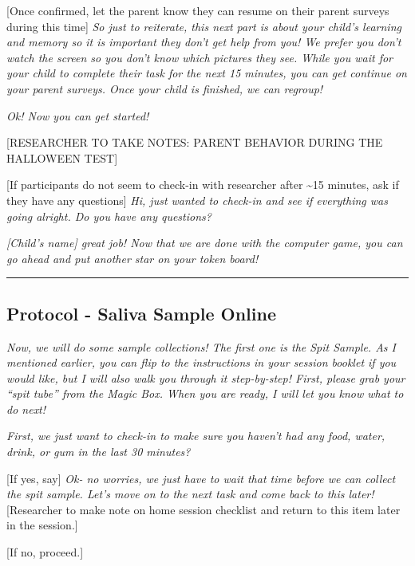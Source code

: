 \documentclass[]{book}
\begin{document}
{[}Once confirmed, let the parent know they can resume on their parent surveys during this time{]} \emph{So just to reiterate, this next part is about your child's learning and memory so it is important they don't get help from you! We prefer you don't watch the screen so you don't know which pictures they see. While you wait for your child to complete their task for the next 15 minutes, you can get continue on your parent surveys. Once your child is finished, we can regroup!}

\emph{Ok! Now you can get started!}

{[}RESEARCHER TO TAKE NOTES: PARENT BEHAVIOR DURING THE HALLOWEEN TEST{]}

{[}If participants do not seem to check-in with researcher after \textasciitilde{}15 minutes, ask if they have any questions{]} \emph{Hi, just wanted to check-in and see if everything was going alright. Do you have any questions?}

\emph{{[}Child's name{]} great job! Now that we are done with the computer game, you can go ahead and put another star on your token board!}

\begin{center}\rule{0.5\linewidth}{0.5pt}\end{center}

\hypertarget{protocol---saliva-sample-online-1}{%
\subsection{Protocol - Saliva Sample Online}\label{protocol---saliva-sample-online-1}}

\emph{Now, we will do some sample collections! The first one is the Spit Sample. As I mentioned earlier, you can flip to the instructions in your session booklet if you would like, but I will also walk you through it step-by-step! First, please grab your ``spit tube'' from the Magic Box. When you are ready, I will let you know what to do next!}

\emph{First, we just want to check-in to make sure you haven't had any food, water, drink, or gum in the last 30 minutes?}

{[}If yes, say{]} \emph{Ok- no worries, we just have to wait that time before we can collect the spit sample. Let's move on to the next task and come back to this later!} {[}Researcher to make note on home session checklist and return to this item later in the session.{]}

{[}If no, proceed.{]}
\end{document}
